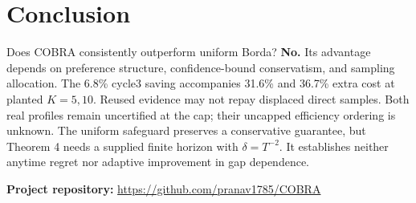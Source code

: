 \documentclass[11pt,a4paper]{article}
\begin{document}
\section{Conclusion}
Does COBRA consistently outperform uniform Borda? \textbf{No.} Its advantage depends on preference structure, confidence-bound conservatism, and sampling allocation. The 6.8\% cycle3 saving accompanies 31.6\% and 36.7\% extra cost at planted $K=5,10$. Reused evidence may not repay displaced direct samples. Both real profiles remain uncertified at the cap; their uncapped efficiency ordering is unknown. The uniform safeguard preserves a conservative guarantee, but Theorem 4 needs a supplied finite horizon with $\delta=T^{-2}$. It establishes neither anytime regret nor adaptive improvement in gap dependence.

\FloatBarrier
{}

\noindent\textbf{Project repository:} \url{https://github.com/pranav1785/COBRA}
\end{document}
